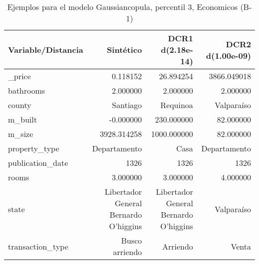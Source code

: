 \begin{table}[H]
\centering
\fontsize{10}{14}\selectfont
\caption{Ejemplos para el modelo Gaussiancopula, percentil 3, Economicos (B-1)}
\label{table-example-economicos-b-1-gaussiancopula-3p}
\begin{tabular}{|l|r|r|r|}
\hline
\rowcolor[gray]{0.8}
Variable/Distancia & Sintético & DCR1 d(2.18e-14) & DCR2 d(1.00e-09) \\
\hline \_price & \cellcolor[rgb]{0.9, 0.54, 0.52} 0.118152 & 26.894254 & 3866.049018 \\
\hline bathrooms & \cellcolor[rgb]{0.9, 0.54, 0.52} 2.000000 & \cellcolor[rgb]{0.9, 0.54, 0.52} 2.000000 & \cellcolor[rgb]{0.9, 0.54, 0.52} 2.000000 \\
\hline county & \cellcolor[rgb]{0.9, 0.54, 0.52} Santiago & Requinoa & Valparaíso \\
\hline m\_built & \cellcolor[rgb]{0.9, 0.54, 0.52} -0.000000 & 230.000000 & 82.000000 \\
\hline m\_size & \cellcolor[rgb]{0.9, 0.54, 0.52} 3928.314258 & 1000.000000 & 82.000000 \\
\hline property\_type & \cellcolor[rgb]{0.9, 0.54, 0.52} Departamento & Casa & \cellcolor[rgb]{0.9, 0.54, 0.52} Departamento \\
\hline publication\_date & \cellcolor[rgb]{0.9, 0.54, 0.52} 1326 & \cellcolor[rgb]{0.9, 0.54, 0.52} 1326 & \cellcolor[rgb]{0.9, 0.54, 0.52} 1326 \\
\hline rooms & \cellcolor[rgb]{0.9, 0.54, 0.52} 3.000000 & \cellcolor[rgb]{0.9, 0.54, 0.52} 3.000000 & 4.000000 \\
\hline state & \cellcolor[rgb]{0.9, 0.54, 0.52} Libertador General Bernardo O'higgins & \cellcolor[rgb]{0.9, 0.54, 0.52} Libertador General Bernardo O'higgins & Valparaíso \\
\hline transaction\_type & \cellcolor[rgb]{0.9, 0.54, 0.52} Busco arriendo & Arriendo & Venta \\
\hline
\end{tabular}
\end{table}
